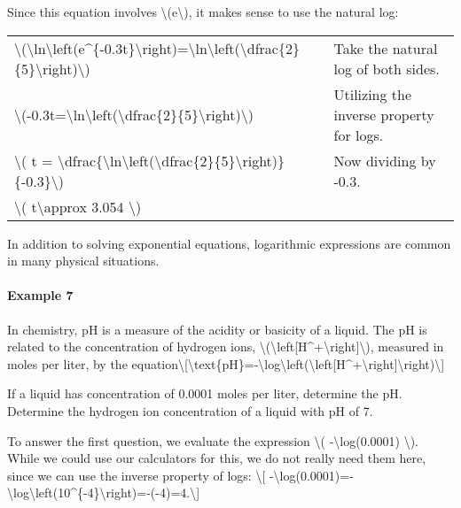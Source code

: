 Since this equation involves \textbackslash{}(e\textbackslash{}), it
makes sense to use the natural log:

\begin{longtable}[]{@{}ll@{}}
\toprule
\endhead
\textbackslash{}(\textbackslash{}ln\textbackslash{}left(e\^{}\{-0.3t\}\textbackslash{}right)=\textbackslash{}ln\textbackslash{}left(\textbackslash{}dfrac\{2\}\{5\}\textbackslash{}right)\textbackslash{})
& Take the natural log of both sides.\tabularnewline
\textbackslash{}(-0.3t=\textbackslash{}ln\textbackslash{}left(\textbackslash{}dfrac\{2\}\{5\}\textbackslash{}right)\textbackslash{})
& Utilizing the inverse property for logs.\tabularnewline
\textbackslash{}( t =
\textbackslash{}dfrac\{\textbackslash{}ln\textbackslash{}left(\textbackslash{}dfrac\{2\}\{5\}\textbackslash{}right)\}\{-0.3\}\textbackslash{})
& Now dividing by -0.3.\tabularnewline
\textbackslash{}( t\textbackslash{}approx 3.054 \textbackslash{})
&\tabularnewline
\bottomrule
\end{longtable}

In addition to solving exponential equations, logarithmic expressions
are common in many physical situations.

\hypertarget{example-7}{%
\paragraph{Example 7}\label{example-7}}

In chemistry, pH is a measure of the acidity or basicity of a liquid.
The pH is related to the concentration of hydrogen ions,
\textbackslash{}(\textbackslash{}left{[}H\^{}+\textbackslash{}right{]}\textbackslash{}),
measured in moles per liter, by the
equation\textbackslash{}{[}\textbackslash{}text\{pH\}=-\textbackslash{}log\textbackslash{}left(\textbackslash{}left{[}H\^{}+\textbackslash{}right{]}\textbackslash{}right)\textbackslash{}{]}

If a liquid has concentration of 0.0001 moles per liter, determine the
pH. Determine the hydrogen ion concentration of a liquid with pH of 7.

To answer the first question, we evaluate the expression
\textbackslash{}( -\textbackslash{}log(0.0001) \textbackslash{}). While
we could use our calculators for this, we do not really need them here,
since we can use the inverse property of logs: \textbackslash{}{[}
-\textbackslash{}log(0.0001)=-\textbackslash{}log\textbackslash{}left(10\^{}\{-4\}\textbackslash{}right)=-(-4)=4.\textbackslash{}{]}

